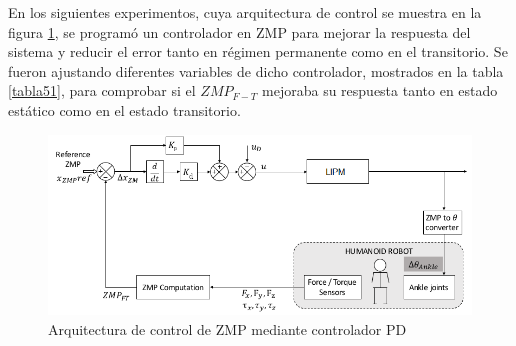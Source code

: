 En los siguientes experimentos, cuya arquitectura de control se muestra en la figura \ref{figura56}, se programó un controlador en ZMP para mejorar la respuesta del sistema y reducir el error tanto en régimen permanente como en el transitorio. Se fueron ajustando diferentes variables de dicho controlador, mostrados en la tabla \ref{tabla51}, para comprobar si el $ZMP_{F-T}$ mejoraba su respuesta tanto en estado estático como en el estado transitorio. 

\begin{figure}[H]
\centering
\includegraphics[scale=0.6]{imagenes/apartado_5/56_esquema_bucle_cerrado}
\caption{Arquitectura de control de ZMP mediante controlador PD}
\label{figura56}
\end{figure}


